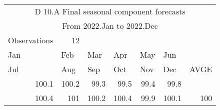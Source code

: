 \begin{tabular}{rrrrrrr}
\toprule
\multicolumn{7}{c}{D 10.A  Final seasonal component forecasts} \\
\multicolumn{7}{c}{  From  2022.Jan to 2022.Dec} \\
\multicolumn{1}{l}{  Observations} & 12    &       &       &       &       &  \\
\midrule
\multicolumn{1}{l}{Jan} & \multicolumn{1}{l}{Feb } & \multicolumn{1}{l}{Mar} & \multicolumn{1}{l}{Apr} & \multicolumn{1}{l}{May} & \multicolumn{1}{l}{Jun } &  \\
\multicolumn{1}{l}{Jul} & \multicolumn{1}{l}{Aug} & \multicolumn{1}{l}{Sep} & \multicolumn{1}{l}{Oct} & \multicolumn{1}{l}{Nov} & \multicolumn{1}{l}{Dec} & \multicolumn{1}{l}{AVGE  } \\
\midrule
100.1 & 100.2 & 99.3  & 99.5  & 99.4  & 99.8  &  \\
100.4 & 101   & 100.2 & 100.4 & 99.9  & 100.1 & 100 \\
\bottomrule
\end{tabular}%
